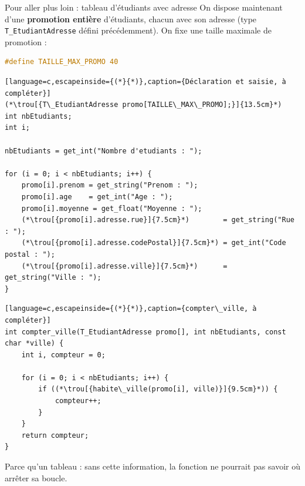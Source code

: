 
\begin{UPSTIexercice}{Pour aller plus loin : tableau d'étudiants avec adresse}
    On dispose maintenant d'une \textbf{promotion entière} d'étudiants, chacun avec son adresse
    (type \texttt{T\_EtudiantAdresse} défini précédemment). On fixe une taille maximale de promotion :
    \begin{lstlisting}[language=C]
#define TAILLE_MAX_PROMO 40
\end{lstlisting}


    \begin{lstlisting}[language=c,escapeinside={(*}{*)},caption={Déclaration et saisie, à compléter}]
(*\trou[{T\_EtudiantAdresse promo[TAILLE\_MAX\_PROMO];}]{13.5cm}*)
int nbEtudiants;
int i;

nbEtudiants = get_int("Nombre d'etudiants : ");

for (i = 0; i < nbEtudiants; i++) {
    promo[i].prenom = get_string("Prenom : ");
    promo[i].age    = get_int("Age : ");
    promo[i].moyenne = get_float("Moyenne : ");
    (*\trou[{promo[i].adresse.rue}]{7.5cm}*)        = get_string("Rue : ");
    (*\trou[{promo[i].adresse.codePostal}]{7.5cm}*) = get_int("Code postal : ");
    (*\trou[{promo[i].adresse.ville}]{7.5cm}*)      = get_string("Ville : ");
}
\end{lstlisting}


    \begin{lstlisting}[language=c,escapeinside={(*}{*)},caption={compter\_ville, à compléter}]
int compter_ville(T_EtudiantAdresse promo[], int nbEtudiants, const char *ville) {
    int i, compteur = 0;

    for (i = 0; i < nbEtudiants; i++) {
        if ((*\trou[{habite\_ville(promo[i], ville)}]{9.5cm}*)) {
            compteur++;
        }
    }
    return compteur;
}
\end{lstlisting}


    Parce qu'un tableau  :
    sans cette information, la fonction ne pourrait pas savoir où arrêter sa boucle.
\end{UPSTIexercice}


